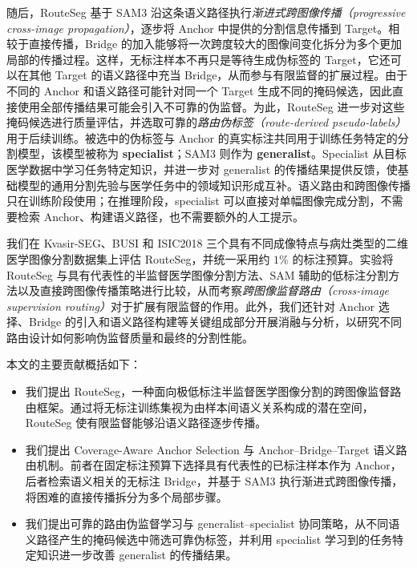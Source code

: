 \documentclass[UTF8,a4paper,10pt]{ctexart}
\begin{document}
随后，RouteSeg 基于 SAM3 沿这条语义路径执行\emph{渐进式跨图像传播（progressive cross-image propagation）}，逐步将 Anchor 中提供的分割信息传播到 Target。相较于直接传播，Bridge 的加入能够将一次跨度较大的图像间变化拆分为多个更加局部的传播过程。这样，无标注样本不再只是等待生成伪标签的 Target，它还可以在其他 Target 的语义路径中充当 Bridge，从而参与有限监督的扩展过程。由于不同的 Anchor 和语义路径可能针对同一个 Target 生成不同的掩码候选，因此直接使用全部传播结果可能会引入不可靠的伪监督。为此，RouteSeg 进一步对这些掩码候选进行质量评估，并选取可靠的\emph{路由伪标签（route-derived pseudo-labels）}用于后续训练。被选中的伪标签与 Anchor 的真实标注共同用于训练任务特定的分割模型，该模型被称为 \textbf{specialist}；SAM3 则作为 \textbf{generalist}。Specialist 从目标医学数据中学习任务特定知识，并进一步对 generalist 的传播结果提供反馈，使基础模型的通用分割先验与医学任务中的领域知识形成互补。语义路由和跨图像传播只在训练阶段使用；在推理阶段，specialist 可以直接对单幅图像完成分割，不需要检索 Anchor、构建语义路径，也不需要额外的人工提示。

我们在 Kvasir-SEG、BUSI 和 ISIC2018 三个具有不同成像特点与病灶类型的二维医学图像分割数据集上评估 RouteSeg，并统一采用约 \(1\%\) 的标注预算。实验将 RouteSeg 与具有代表性的半监督医学图像分割方法、SAM 辅助的低标注分割方法以及直接跨图像传播策略进行比较，从而考察\emph{跨图像监督路由（cross-image supervision routing）}对于扩展有限监督的作用。此外，我们还针对 Anchor 选择、Bridge 的引入和语义路径构建等关键组成部分开展消融与分析，以研究不同路由设计如何影响伪监督质量和最终的分割性能。

本文的主要贡献概括如下：

\begin{itemize}
    \item  我们提出 RouteSeg，一种面向极低标注半监督医学图像分割的跨图像监督路由框架。通过将无标注训练集视为由样本间语义关系构成的潜在空间，RouteSeg 使有限监督能够沿语义路径逐步传播。

    \item 我们提出 Coverage-Aware Anchor Selection 与 Anchor--Bridge--Target 语义路由机制。前者在固定标注预算下选择具有代表性的已标注样本作为 Anchor，后者检索语义相关的无标注 Bridge，并基于 SAM3 执行渐进式跨图像传播，将困难的直接传播拆分为多个局部步骤。

    \item 我们提出可靠的路由伪监督学习与 generalist--specialist 协同策略，从不同语义路径产生的掩码候选中筛选可靠伪标签，并利用 specialist 学习到的任务特定知识进一步改善 generalist 的传播结果。
\end{itemize}
\end{document}
